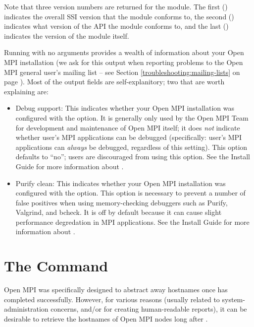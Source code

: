 Note that three version numbers are returned for the  module.
The first () indicates the overall SSI version that the
module conforms to, the second () indicates what version
of the  API the module conforms to, and the last
() indicates the version of the module itself.

Running  with no arguments provides a wealth of
information about your Open MPI installation (we ask for this output
when reporting problems to the Open MPI general user's mailing list --
see Section \ref{troubleshooting:mailing-lists} on page
\pageref{troubleshooting:mailing-lists}).  Most of the output fields
are self-explanitory; two that are worth explaining are:

\begin{itemize}
\item Debug support: This indicates whether your Open MPI installation was
  configured with the  option.  It is generally
  only used by the Open MPI Team for development and maintenance of Open MPI
  itself; it does {\em not} indicate whether user's MPI applications
  can be debugged (specifically: user's MPI applications can {\em
    always} be debugged, regardless of this setting).  This option
  defaults to ``no''; users are discouraged from using this option.
  See the Install Guide for more information about
  .
  
\item Purify clean: This indicates whether your Open MPI installation was
  configured with the  option.  This option is
  necessary to prevent a number of false positives when using
  memory-checking debuggers such as Purify, Valgrind, and bcheck.  It
  is off by default because it can cause slight performance
  degredation in MPI applications.  See the Install Guide for more
  information about .
\end{itemize}


\section{The  Command}
\label{sec:commands-lamnodes}

Open MPI was specifically designed to abstract away hostnames once
 has completed successfully.  However, for various
reasons (usually related to system-administration concerns, and/or for
creating human-readable reports), it can be desirable to retrieve the
hostnames of Open MPI nodes long after .

